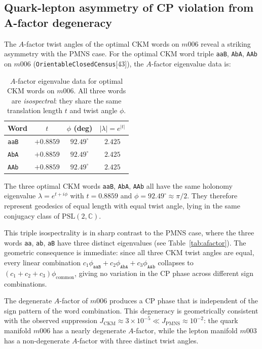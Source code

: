 \documentclass[epjc3]{svjour3}
\newcommand{\PSL}{\mathrm{PSL}(2,\mathbb{C})}
\begin{document}
\subsection{Quark-lepton asymmetry of CP violation from A-factor degeneracy}
\label{sec:ckm_afactor}

The $A$-factor twist angles of the optimal CKM words on $m006$
reveal a striking asymmetry with the PMNS case.
For the optimal CKM word triple \texttt{aaB}, \texttt{AbA}, \texttt{AAb}
on $m006$ (\texttt{OrientableClosedCensus}[43]), the $A$-factor
eigenvalue data is:

\begin{table}[h]
\centering
\caption{$A$-factor eigenvalue data for optimal CKM words on $m006$.
All three words are \emph{isospectral}: they share the same translation
length $t$ and twist angle $\phi$.}
\label{tab:ckm_afactor}
\begin{tabular}{lccc}
\toprule
Word & $t$ & $\phi$ (deg) & $|\lambda| = e^{|t|}$ \\
\midrule
\texttt{aaB} & $+0.8859$ & $92.49^\circ$ & $2.425$ \\
\texttt{AbA} & $+0.8859$ & $92.49^\circ$ & $2.425$ \\
\texttt{AAb} & $+0.8859$ & $92.49^\circ$ & $2.425$ \\
\bottomrule
\end{tabular}
\end{table}

\begin{proposition}
\label{prop:ckm_isospectral}
The three optimal CKM words \texttt{aaB}, \texttt{AbA}, \texttt{AAb}
all have the same holonomy eigenvalue $\lambda = e^{t+i\phi}$ with
$t = 0.8859$ and $\phi = 92.49^\circ \approx \pi/2$.
They therefore represent geodesics of equal length with equal twist
angle, lying in the same conjugacy class of $\PSL$.
\end{proposition}

This triple isospectrality is in sharp contrast to the PMNS case,
where the three words \texttt{aa}, \texttt{ab}, \texttt{aB} have
three distinct eigenvalues (see Table~\ref{tab:afactor}).
The geometric consequence is immediate: since all three CKM twist
angles are equal, every linear combination
$c_1\phi_{\texttt{aaB}} + c_2\phi_{\texttt{AbA}} + c_3\phi_{\texttt{AAb}}$
collapses to $(c_1+c_2+c_3)\phi_{\mathrm{common}}$, giving no
variation in the CP phase across different sign combinations.

\begin{corollary}
\label{cor:ckm_suppression}
The degenerate $A$-factor of $m006$ produces a CP phase that is
independent of the sign pattern of the word combination.
This degeneracy is geometrically consistent with the observed
suppression $J_{\mathrm{CKM}} \approx 3\times10^{-5} \ll
J_{\mathrm{PMNS}} \approx 10^{-2}$: the quark manifold $m006$
has a nearly degenerate $A$-factor, while the lepton manifold
$m003$ has a non-degenerate $A$-factor with three distinct
twist angles.
\end{corollary}
\end{document}
